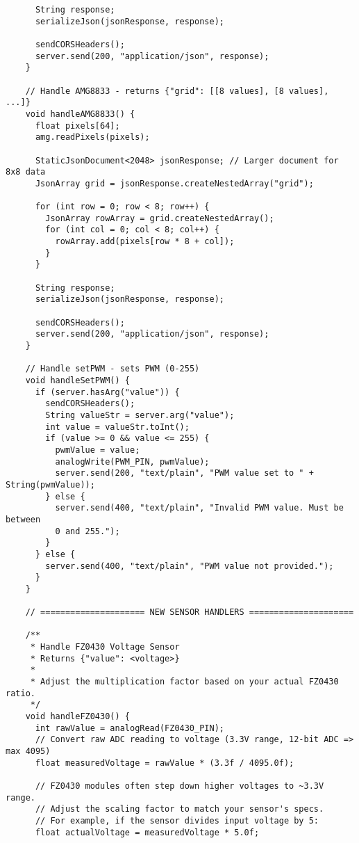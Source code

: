 \begin{verbatim}
      String response;
      serializeJson(jsonResponse, response);
    
      sendCORSHeaders();
      server.send(200, "application/json", response);
    }
    
    // Handle AMG8833 - returns {"grid": [[8 values], [8 values], ...]}
    void handleAMG8833() {
      float pixels[64];
      amg.readPixels(pixels);
    
      StaticJsonDocument<2048> jsonResponse; // Larger document for 8x8 data
      JsonArray grid = jsonResponse.createNestedArray("grid");
    
      for (int row = 0; row < 8; row++) {
        JsonArray rowArray = grid.createNestedArray();
        for (int col = 0; col < 8; col++) {
          rowArray.add(pixels[row * 8 + col]);
        }
      }
    
      String response;
      serializeJson(jsonResponse, response);
    
      sendCORSHeaders();
      server.send(200, "application/json", response);
    }
    
    // Handle setPWM - sets PWM (0-255)
    void handleSetPWM() {
      if (server.hasArg("value")) {
        sendCORSHeaders();
        String valueStr = server.arg("value");
        int value = valueStr.toInt();
        if (value >= 0 && value <= 255) {
          pwmValue = value;
          analogWrite(PWM_PIN, pwmValue);
          server.send(200, "text/plain", "PWM value set to " + String(pwmValue));
        } else {
          server.send(400, "text/plain", "Invalid PWM value. Must be between 
          0 and 255.");
        }
      } else {
        server.send(400, "text/plain", "PWM value not provided.");
      }
    }
    
    // ===================== NEW SENSOR HANDLERS =====================
    
    /**
     * Handle FZ0430 Voltage Sensor
     * Returns {"value": <voltage>}
     * 
     * Adjust the multiplication factor based on your actual FZ0430 ratio.
     */
    void handleFZ0430() {
      int rawValue = analogRead(FZ0430_PIN);
      // Convert raw ADC reading to voltage (3.3V range, 12-bit ADC => max 4095)
      float measuredVoltage = rawValue * (3.3f / 4095.0f);
    
      // FZ0430 modules often step down higher voltages to ~3.3V range.
      // Adjust the scaling factor to match your sensor's specs.
      // For example, if the sensor divides input voltage by 5:
      float actualVoltage = measuredVoltage * 5.0f;
    

\end{verbatim}
